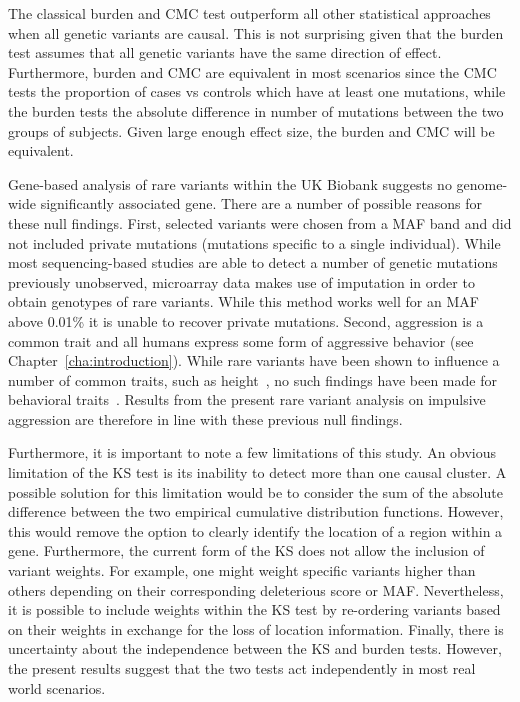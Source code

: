 The classical burden and CMC test outperform all other statistical approaches when all genetic variants are causal.
This is not surprising given that the burden test assumes that all genetic variants have the same direction of effect.
Furthermore, burden and CMC are equivalent in most scenarios since the CMC tests the proportion of cases vs controls which have at least one mutations, while the burden tests the absolute difference in number of  mutations between the two groups of subjects.
Given large enough effect size, the burden and CMC will be equivalent.

Gene-based analysis of rare variants within the UK Biobank suggests no genome-wide significantly associated gene.
There are a number of possible reasons for these null findings.
First, selected variants were chosen from a MAF band and did not included private mutations (mutations specific to a single individual).
While most sequencing-based studies are able to detect a number of genetic mutations previously unobserved, microarray data makes use of imputation in order to obtain genotypes of rare variants.
While this method works well for an MAF above 0.01\% it is unable to recover private mutations.
Second, aggression is a common trait and all humans express some form of aggressive behavior (see Chapter~\ref{cha:introduction}).
While rare variants have been shown to  influence a number of common traits, such as height~\cite{Marouli2017}, no such findings have been made for behavioral traits~\cite{Chabris2015}.
Results from the present rare variant analysis on impulsive aggression are therefore in line with these previous null findings.

Furthermore, it is important to note a few limitations of this study.
An obvious limitation of the KS test is its inability to detect more than one causal cluster.
A possible solution for this limitation would be to consider the sum of the absolute difference between the two empirical cumulative distribution functions. 
However, this would remove the option to clearly identify the location of a region within a gene. 
Furthermore, the current form of the KS does not allow the inclusion of variant weights.
For example, one might  weight specific variants higher than others depending  on their corresponding deleterious score or MAF\@.
Nevertheless, it is possible to include weights within the KS test by re-ordering variants based on their weights in exchange for the loss of location information.
Finally, there is  uncertainty about the independence between the KS and burden tests.
However, the  present results suggest that the two tests act independently in most real world scenarios.  


